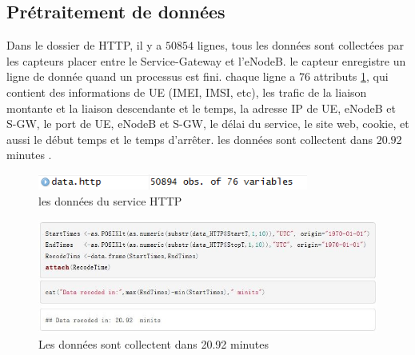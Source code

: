 \subsection{Prétraitement de données}
Dans le dossier de HTTP, il y a $50854$ lignes, tous les données sont collectées par les capteurs placer entre le Service-Gateway et l'eNodeB. le capteur enregistre un ligne de donnée quand un processus est fini. chaque ligne a $76$ attributs \ref{Fig.HTTP}, qui contient des informations de UE (IMEI, IMSI, etc), les trafic de la liaison montante et la liaison descendante et le temps, la adresse IP de UE, eNodeB et S-GW, le port de UE, eNodeB et S-GW, le délai du service, le site web, cookie, et aussi le début temps et le temps d'arrêter.
les données sont collectent dans $20.92$ minutes .
      \begin{figure}[H]
          \centering
          \includegraphics[width=3.5in]{images/http.png}
          \caption{les données du service HTTP}
          \label{Fig.HTTP}
      \end{figure}
      
      \begin{figure}[H]
\centering
\includegraphics[width=15Cm]{images/lasttime}
\caption{Les données sont collectent dans 20.92 minutes}
\label{fig:lasttime}
\end{figure}


